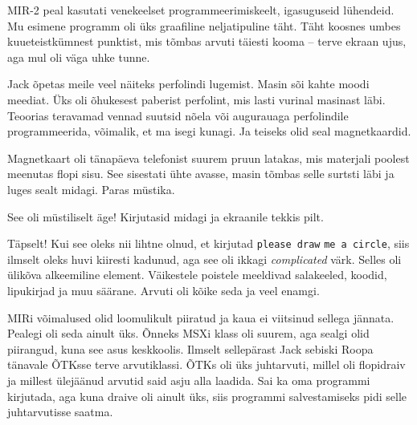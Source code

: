 MIR-2 peal kasutati venekeelset programmeerimiskeelt, igasuguseid
lühendeid. Mu esimene programm oli üks graafiline neljatipuline täht. Täht
koosnes umbes kuueteistkümnest punktist, mis 
tõmbas arvuti täiesti kooma -- terve ekraan ujus, aga mul oli väga uhke tunne. 

Jack õpetas meile veel näiteks 
perfolindi lugemist. Masin sõi kahte moodi meediat. Üks oli õhukesest paberist 
perfolint, mis lasti vurinal masinast läbi. Teoorias teravamad vennad 
suutsid nõela või augurauaga perfolindile programmeerida, võimalik, et ma isegi 
kunagi. Ja teiseks olid seal magnetkaardid. 


Magnetkaart oli tänapäeva telefonist suurem pruun latakas, mis materjali 
poolest meenutas flopi sisu. See sisestati ühte
avasse, masin tõmbas selle 
surtsti läbi ja luges sealt midagi. Paras müstika. 


See oli müstiliselt äge! Kirjutasid midagi ja ekraanile 
tekkis pilt.


Täpselt! Kui see oleks nii lihtne olnud, et kirjutad \verb|please draw| \verb|me a circle|, 
siis ilmselt oleks huvi kiiresti kadunud, aga see oli ikkagi \emph{complicated} 
värk. 
Selles oli ülikõva alkeemiline element. Väikestele poistele 
meeldivad salakeeled, koodid, lipukirjad ja muu säärane. Arvuti
oli kõike seda ja veel enamgi.

MIRi võimalused olid loomulikult piiratud ja kaua ei viitsinud sellega
jännata. Pealegi oli seda ainult üks. Õnneks MSXi klass oli
suurem, aga sealgi olid piirangud, kuna see asus 
keskkoolis. Ilmselt sellepärast Jack sebiski 
Roopa tänavale ÕTKsse terve arvutiklassi. ÕTKs oli üks
juhtarvuti, millel oli flopidraiv ja millest ülejäänud arvutid said 
asju alla laadida. Sai ka oma programmi kirjutada, aga kuna 
draive oli ainult üks, siis programmi salvestamiseks pidi selle 
juhtarvutisse saatma. 

